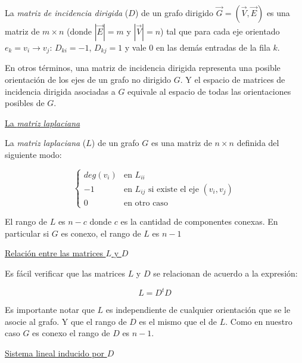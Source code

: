\documentclass[a4paper,11pt]{article}
\begin{document}
\bigskip

La \textit{matriz de incidencia dirigida} ($D$) de un grafo dirigido 
$\vec G = (\vec V, \vec E)$ es una matriz de $m \times n$ (donde $|\vec
 E| = m$ y $|\vec V| = n$) tal que para cada eje orientado 
$e_k=v_i \rightarrow v_j$: $D_{ki} = -1$, $D_{kj} = 1$ y vale $0$ en 
las demás entradas de la fila $k$.

\bigskip

En otros términos, una matriz de incidencia dirigida representa una 
posible orientación de los ejes de un grafo no dirigido $G$. Y el 
espacio de matrices de incidencia dirigida asociadas a $G$ 
equivale al espacio de todas las orientaciones posibles de $G$.

\bigskip

\underline{La \textit{matriz laplaciana}}

\bigskip

La \textit{matriz laplaciana} ($L$) de un grafo $G$ es una matriz de 
$n \times n$ definida del siguiente modo:

\bigskip

\begin{equation}
	\begin{cases}
	deg(v_i) & \text{en $L_{ii}$} \\
	-1 & \text{en $L_{ij}$ si existe el eje $(v_i,v_j)$} \\
	0 & \text{en otro caso} 
	\end{cases}
\end{equation}

\bigskip

El rango de $L$ es $n-c$ donde $c$ es la cantidad de componentes 
conexas. En particular si $G$ es conexo, el rango de $L$ es $n-1$

\bigskip

\underline{Relación entre las matrices $L$ y $D$}

\bigskip

Es fácil verificar que las matrices $L$ y $D$ se relacionan de acuerdo
a la expresión:

$$L = D^t D$$

Es importante notar que $L$ es independiente de cualquier orientación 
que se le asocie al grafo. Y que el rango de $D$ es el mismo que el de 
$L$. Como en nuestro caso $G$ es conexo el rango de $D$ es $n-1$.

\bigskip

\underline{Sistema lineal inducido por $D$}

\bigskip
\end{document}
